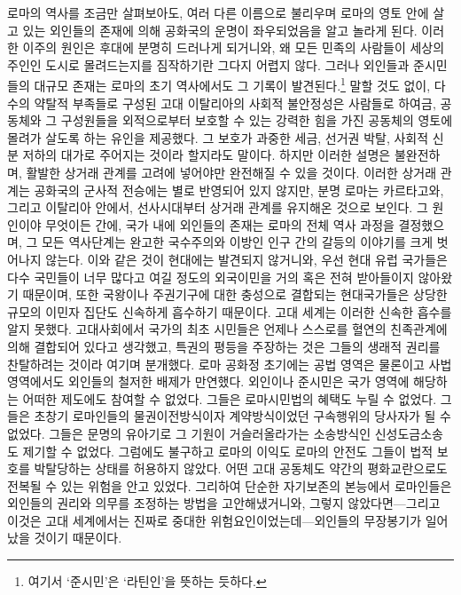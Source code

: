로마의 역사를 조금만 살펴보아도,
여러 다른 이름으로 불리우며
로마의 영토 안에
살고 있는 외인들의 존재에 의해 공화국의 운명이
좌우되었음을 알고 놀라게 된다.
이러한 이주의 원인은 후대에 분명히 드러나게 되거니와,
왜 모든 민족의 사람들이 세상의 주인인 도시로 몰려드는지를
짐작하기란 그다지 어렵지 않다.
그러나 외인들과 준시민들의 대규모 존재는
로마의 초기 역사에서도 그 기록이 발견된다.\footnote{여기서 `준시민'은
`라틴인'을 뜻하는 듯하다.}
말할 것도 없이,
다수의 약탈적 부족들로 구성된 고대 이탈리아의 사회적 불안정성은
사람들로 하여금, 공동체와 그 구성원들을 외적으로부터 보호할 수 있는
강력한 힘을 가진 공동체의 영토에 몰려가 살도록 하는 유인을 제공했다.
그 보호가 과중한 세금, 선거권 박탈, 사회적 신분 저하의 대가로
주어지는 것이라 할지라도 말이다.
하지만 이러한 설명은 불완전하며,
활발한 상거래 관계를 고려에 넣어야만 완전해질 수 있을 것이다.
이러한 상거래 관계는 공화국의 군사적 전승에는
별로 반영되어 있지 않지만,
분명 로마는 카르타고와, 그리고 이탈리아 안에서,
선사시대부터 상거래 관계를 유지해온 것으로 보인다.
그 원인이야 무엇이든 간에,
국가 내에 외인들의 존재는
로마의 전체 역사 과정을 결정했으며,
그 모든 역사단계는 완고한 국수주의와 이방인 인구 간의 갈등의 이야기를
크게 벗어나지 않는다.
이와 같은 것이 현대에는 발견되지 않거니와,
우선 현대 유럽 국가들은 다수 국민들이 너무 많다고 여길 정도의
외국이민을 거의 혹은 전혀 받아들이지 않아왔기 때문이며,
또한
국왕이나 주권기구에 대한 충성으로 결합되는 현대국가들은
상당한 규모의 이민자 집단도
신속하게 흡수하기 때문이다.
고대 세계는 이러한 신속한 흡수를 알지 못했다.
고대사회에서 국가의 최초 시민들은 언제나 스스로를 혈연의 친족관계에 의해
결합되어 있다고 생각했고,
특권의 평등을 주장하는 것은 그들의 생래적 권리를 찬탈하려는 것이라
여기며 분개했다.
로마 공화정 초기에는
공법 영역은 물론이고 사법 영역에서도
외인들의 철저한 배제가 만연했다.
외인이나 준시민은
국가 영역에 해당하는 어떠한 제도에도 참여할 수 없었다.
그들은 로마시민법의 혜택도 누릴 수 없었다.
그들은 초창기 로마인들의 물권이전방식이자 계약방식이었던
구속행위의 당사자가 될 수 없었다.
그들은 문명의 유아기로 그 기원이 거슬러올라가는 소송방식인
신성도금소송도 제기할 수 없었다.
그럼에도 불구하고 로마의 이익도 로마의 안전도 그들이 법적 보호를 박탈당하는
상태를 허용하지 않았다.
어떤 고대 공동체도 약간의 평화교란으로도 전복될 수 있는 위험을 안고 있었다.
그리하여 단순한 자기보존의 본능에서 로마인들은
외인들의 권리와 의무를 조정하는 방법을 고안해냈거니와,
그렇지 않았다면---그리고 이것은 고대 세계에서는
진짜로 중대한 위험요인이었는데---외인들의 무장봉기가 일어났을 것이기 때문이다.
